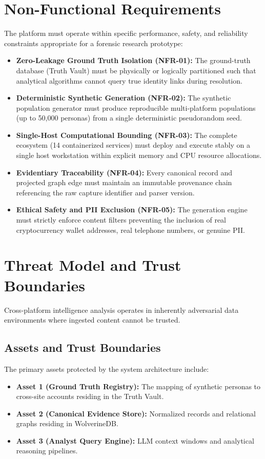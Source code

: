\section{Non-Functional Requirements}
\label{sec:req-nonfunctional}
The platform must operate within specific performance, safety, and reliability constraints appropriate for a forensic research prototype:

\begin{itemize}
    \item \textbf{Zero-Leakage Ground Truth Isolation (NFR-01):} The ground-truth database (Truth Vault) must be physically or logically partitioned such that analytical algorithms cannot query true identity links during resolution.
    \item \textbf{Deterministic Synthetic Generation (NFR-02):} The synthetic population generator must produce reproducible multi-platform populations (up to 50,000 personas) from a single deterministic pseudorandom seed.
    \item \textbf{Single-Host Computational Bounding (NFR-03):} The complete ecosystem (14 containerized services) must deploy and execute stably on a single host workstation within explicit memory and CPU resource allocations.
    \item \textbf{Evidentiary Traceability (NFR-04):} Every canonical record and projected graph edge must maintain an immutable provenance chain referencing the raw capture identifier and parser version.
    \item \textbf{Ethical Safety and PII Exclusion (NFR-05):} The generation engine must strictly enforce content filters preventing the inclusion of real cryptocurrency wallet addresses, real telephone numbers, or genuine PII.
\end{itemize}

\section{Threat Model and Trust Boundaries}
\label{sec:req-threat-model}
Cross-platform intelligence analysis operates in inherently adversarial data environments where ingested content cannot be trusted.

\subsection{Assets and Trust Boundaries}
The primary assets protected by the system architecture include:
\begin{itemize}
    \item \textbf{Asset 1 (Ground Truth Registry):} The mapping of synthetic personas to cross-site accounts residing in the Truth Vault.
    \item \textbf{Asset 2 (Canonical Evidence Store):} Normalized records and relational graphs residing in WolverineDB.
    \item \textbf{Asset 3 (Analyst Query Engine):} LLM context windows and analytical reasoning pipelines.
\end{itemize}

